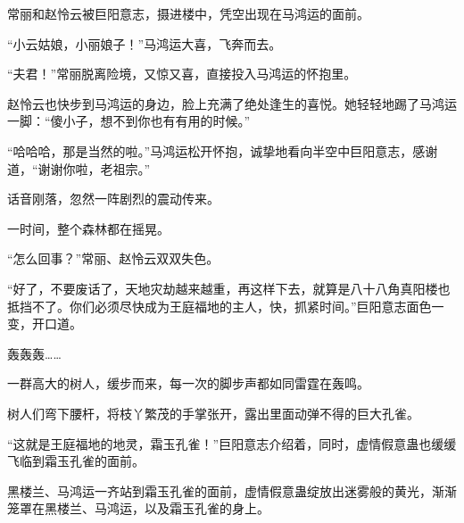 \begin{this_body}
常丽和赵怜云被巨阳意志，摄进楼中，凭空出现在马鸿运的面前。

“小云姑娘，小丽娘子！”马鸿运大喜，飞奔而去。

“夫君！”常丽脱离险境，又惊又喜，直接投入马鸿运的怀抱里。

赵怜云也快步到马鸿运的身边，脸上充满了绝处逢生的喜悦。她轻轻地踢了马鸿运一脚：“傻小子，想不到你也有有用的时候。”

“哈哈哈，那是当然的啦。”马鸿运松开怀抱，诚挚地看向半空中巨阳意志，感谢道，“谢谢你啦，老祖宗。”

话音刚落，忽然一阵剧烈的震动传来。

一时间，整个森林都在摇晃。

“怎么回事？”常丽、赵怜云双双失色。

“好了，不要废话了，天地灾劫越来越重，再这样下去，就算是八十八角真阳楼也抵挡不了。你们必须尽快成为王庭福地的主人，快，抓紧时间。”巨阳意志面色一变，开口道。

轰轰轰……

一群高大的树人，缓步而来，每一次的脚步声都如同雷霆在轰鸣。

树人们弯下腰杆，将枝丫繁茂的手掌张开，露出里面动弹不得的巨大孔雀。

“这就是王庭福地的地灵，霜玉孔雀！”巨阳意志介绍着，同时，虚情假意蛊也缓缓飞临到霜玉孔雀的面前。

黑楼兰、马鸿运一齐站到霜玉孔雀的面前，虚情假意蛊绽放出迷雾般的黄光，渐渐笼罩在黑楼兰、马鸿运，以及霜玉孔雀的身上。

\end{this_body}

